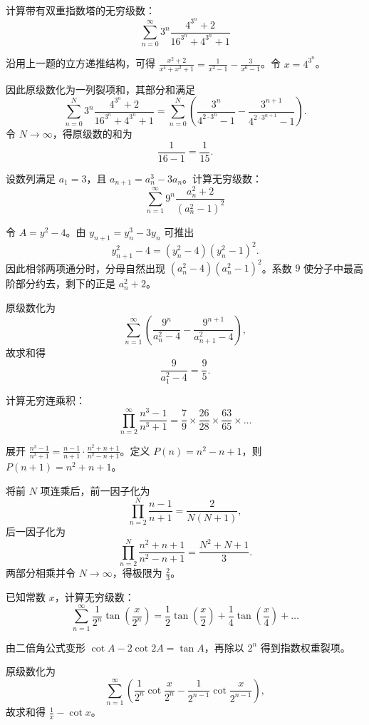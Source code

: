 \begin{example}
    计算带有双重指数塔的无穷级数：$$ \sum_{n=0}^{\infty} 3^n \frac{4^{3^n}+2}{16^{3^n} + 4^{3^n} + 1} $$
\end{example}
\begin{solution}
沿用上一题的立方递推结构，可得 \(\frac{x^2+2}{x^4+x^2+1} = \frac{1}{x^2-1} - \frac{3}{x^6-1}\)。令 \(x=4^{3^n}\)。

因此原级数化为一列裂项和，其部分和满足
\[
\sum_{n=0}^{N} 3^n \frac{4^{3^n}+2}{16^{3^n}+4^{3^n}+1}
=\sum_{n=0}^{N}\left(\frac{3^n}{4^{2\cdot 3^n}-1}-\frac{3^{n+1}}{4^{2\cdot 3^{n+1}}-1}\right).
\]
令 \(N\to\infty\)，得原级数的和为
\[
\frac{1}{16-1}=\frac{1}{15}.
\]
\end{solution}

\begin{example}
    设数列满足 \(a_1 = 3\)，且 \(a_{n+1} = a_n^3 - 3a_n\)。计算无穷级数：$$ \sum_{n=1}^{\infty} 9^n \frac{a_n^2+2}{(a_n^2-1)^2} $$
\end{example}
\begin{solution}
令 \(A=y^2-4\)。由 \(y_{n+1}=y_n^3-3y_n\) 可推出
\[
y_{n+1}^2-4=(y_n^2-4)(y_n^2-1)^2.
\]
因此相邻两项通分时，分母自然出现 \((a_n^2-4)(a_n^2-1)^2\)。系数 \(9\) 使分子中最高阶部分约去，剩下的正是 \(a_n^2+2\)。

原级数化为
\[
\sum_{n=1}^{\infty}\left(\frac{9^n}{a_n^2-4}-\frac{9^{n+1}}{a_{n+1}^2-4}\right),
\]
故求和得
\[
\frac{9}{a_1^2-4}=\frac{9}{5}.
\]
\end{solution}

\begin{example}
    计算无穷连乘积：$$ \prod_{n=2}^{\infty} \frac{n^3-1}{n^3+1} = \frac{7}{9} \times \frac{26}{28} \times \frac{63}{65} \times \dots $$
\end{example}
\begin{solution}
展开 \(\frac{n^3-1}{n^3+1} = \frac{n-1}{n+1} \cdot \frac{n^2+n+1}{n^2-n+1}\)。定义 \(P(n)=n^2-n+1\)，则 \(P(n+1)=n^2+n+1\)。

将前 \(N\) 项连乘后，前一因子化为
\[
\prod_{n=2}^{N}\frac{n-1}{n+1}=\frac{2}{N(N+1)},
\]
后一因子化为
\[
\prod_{n=2}^{N}\frac{n^2+n+1}{n^2-n+1}=\frac{N^2+N+1}{3}.
\]
两部分相乘并令 \(N\to\infty\)，得极限为 \(\frac{2}{3}\)。
\end{solution}

\begin{example}
    已知常数 \(x\)，计算无穷级数：$$ \sum_{n=1}^\infty \frac{1}{2^n} \tan\left(\frac{x}{2^n}\right) = \frac{1}{2}\tan\left(\frac{x}{2}\right) + \frac{1}{4}\tan\left(\frac{x}{4}\right) + \dots $$
\end{example}
\begin{solution}
由二倍角公式变形 \(\cot A - 2\cot 2A = \tan A\)，再除以 \(2^n\) 得到指数权重裂项。

原级数化为
\[
\sum_{n=1}^{\infty}\left(\frac{1}{2^n}\cot\frac{x}{2^n}-\frac{1}{2^{n-1}}\cot\frac{x}{2^{n-1}}\right),
\]
故求和得 \(\frac{1}{x}-\cot x\)。
\end{solution}

